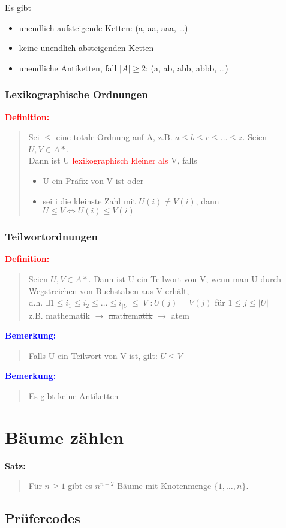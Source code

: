 \documentclass{article}
\newcommand{\red}[1]{\textcolor{red}{#1}}
\newcommand{\blue}[1]{\textcolor{blue}{#1}}
\newcommand{\dgr}[1]{\textcolor{dgr}{#1}}
\newcommand{\de}[1]{\red{\textbf{Definition: }}\begin{quote}#1\end{quote}}
\newcommand{\an}[1]{\blue{\textbf{Bemerkung: }}\begin{quote}#1\end{quote}}
\newcommand{\se}[1]{\dgr{\textbf{Satz: }}\begin{quote}#1\end{quote}}
\begin{document}
Es gibt
\begin{itemize}
    \item unendlich aufsteigende Ketten: (a, aa, aaa, \dots)
    \item keine unendlich absteigenden Ketten
    \item unendliche Antiketten, fall $|A| \ge 2$: (a, ab, abb, abbb, \dots)
\end{itemize}

\subsubsection{Lexikographische Ordnungen}

\de{
    Sei $\le$ eine totale Ordnung auf A, z.B. $a \le b \le c \le \dots \le z$. Seien $U,V \in A*$.\\
    Dann ist U \red{lexikographisch kleiner als} V, falls
    \begin{itemize}
        \item U ein Präfix von V ist oder
        \item sei i die kleinste Zahl mit $U(i) \ne V(i)$, dann $U \le V \iff U(i) \le V(i)$
    \end{itemize}
}

\subsubsection{Teilwortordnungen}

\de{
    Seien $U, V \in A*$. Dann ist U ein Teilwort von V, wenn man U durch Wegstreichen von Buchstaben aus V erhält,\\
    d.h. $\exists 1 \leq i_1 \leq i_2 \leq \dots \leq i_{|U|} \leq |V|: U(j) = V(j)$ für $1 \leq j \leq |U|$\\
    z.B. mathematik $\to$ \sout{m}at\sout{h}em\sout{atik} $\to$ atem
}

\an{
    Falls U ein Teilwort von V ist, gilt: $U \leq V$
}

\an{
    Es gibt keine Antiketten
}

\newpage
\section{Bäume zählen}

\se{
    Für $n \geq 1$ gibt es $n^{n-2}$ Bäume mit Knotenmenge $\{1, \dots, n\}$.
}

\subsection{Prüfercodes}
\end{document}
